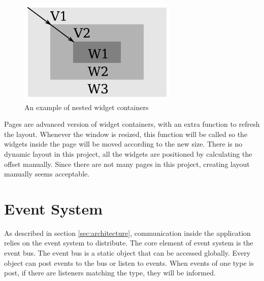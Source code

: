 \documentclass[msc,deptreport, cs]{infthesis}
\begin{document}
\begin{figure}[!htb]
  \centering
  \includegraphics[width=0.26\columnwidth]{container.pdf}
  \caption{An example of nested widget containers}
  \label{fig:container}
\end{figure}

Pages are advanced version of widget containers, with an extra function to refresh the layout. Whenever the window is resized, this function will be called so the widgets inside the page will be moved according to the new size. There is no dynamic layout in this project, all the widgets are positioned by calculating the offset manually. Since there are not many pages in this project, creating layout manually seems acceptable. 

\section{Event System} \label{sec:event}

As described in section \ref{sec:architecture}, communication inside the application relies on the event system to distribute. The core element of event system is the event bus. The event bus is a static object that can be accessed globally. Every object can post events to the bus or listen to events. When events of one type is post, if there are listeners matching the type, they will be informed.
\end{document}

